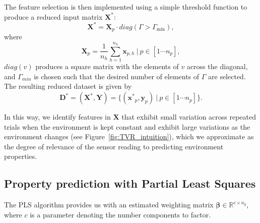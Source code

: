 
The feature selection is then implemented using a simple threshold function to produce a reduced input matrix $\mathbf{X}^*$:
   \begin{equation} \mathbf{X}^* = \mathbf{X}_p \cdot diag(\Gamma > \Gamma_{\min}),\end{equation} 
where
\begin{equation}\mathbf{X}_{p} = \frac{1}{n_h}\sum_{h=1}^{n_h}{\mathbf{x}_{p,h}}~\lvert~ p\in[1\cdots n_p],\end{equation} 
$diag(v)$ produces a square matrix with the elements of $v$ across the diagonal, and $\Gamma_{min}$ is chosen such that the desired number of elements of $\Gamma$ are selected.
The resulting reduced dataset is given by
\begin{equation}   \mathbf{D}^* = (\mathbf{X}^*,\mathbf{\mathbf{Y}}) = \{ (\mathbf{x^*}_{p},\mathbf{y}_{p})~\lvert~ p\in[1\cdots n_p] \}. \end{equation} 

In this way, we identify features in $\mathbf{X}$ that exhibit small variation across repeated trials when the environment is kept constant and exhibit large variations as the environment changes (see Figure~\ref{fig:TVR_intuition}), which we approximate as the degree of relevance of the sensor reading to predicting environment properties.

\subsection{Property prediction with Partial Least Squares}
\label{sec:PLS}


The PLS algorithm provides us with an estimated weighting matrix $\mathbf{\beta} \in \mathbb{R}^{c\times n_y}$, where $c$ is a parameter denoting the number components to factor.

